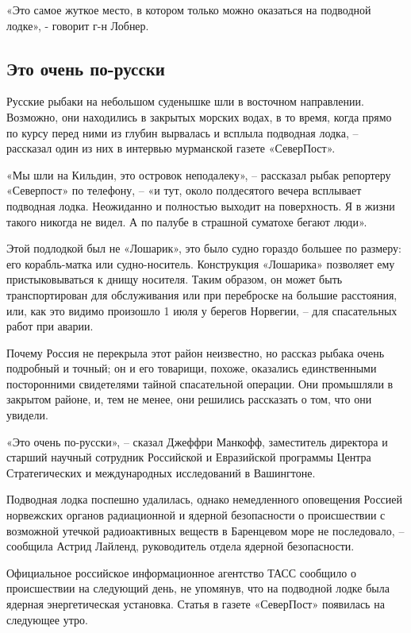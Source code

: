 «Это самое жуткое место, в котором только можно оказаться на подводной
лодке», - говорит г-н Лобнер.

\hypertarget{ux44dux442ux43e-ux43eux447ux435ux43dux44c-ux43fux43e-ux440ux443ux441ux441ux43aux438}{%
\subsection{Это очень
по-русски}\label{ux44dux442ux43e-ux43eux447ux435ux43dux44c-ux43fux43e-ux440ux443ux441ux441ux43aux438}}

Русские рыбаки на небольшом суденышке шли в восточном направлении.
Возможно, они находились в закрытых морских водах, в то время, когда
прямо по курсу перед ними из глубин вырвалась и всплыла подводная лодка,
-- рассказал один из них в интервью мурманской газете «СеверПост».

«Мы шли на Кильдин, это островок неподалеку», -- рассказал рыбак
репортеру «Северпост» по телефону, -- «и тут, около полдесятого вечера
всплывает подводная лодка. Неожиданно и полностью выходит на
поверхность. Я в жизни такого никогда не видел. А по палубе в страшной
суматохе бегают люди».

Этой подлодкой был не «Лошарик», это было судно гораздо большее по
размеру: его корабль-матка или судно-носитель. Конструкция «Лошарика»
позволяет ему пристыковываться к днищу носителя. Таким образом, он может
быть транспортирован для обслуживания или при переброске на большие
расстояния, или, как это видимо произошло 1 июля у берегов Норвегии, --
для спасательных работ при аварии.

Почему Россия не перекрыла этот район неизвестно, но рассказ рыбака
очень подробный и точный; он и его товарищи, похоже, оказались
единственными посторонними свидетелями тайной спасательной операции. Они
промышляли в закрытом районе, и, тем не менее, они решились рассказать о
том, что они увидели.

«Это очень по-русски», -- сказал Джеффри Манкофф, заместитель директора
и старший научный сотрудник Российской и Евразийской программы Центра
Стратегических и международных исследований в Вашингтоне.

Подводная лодка поспешно удалилась, однако немедленного оповещения
Россией норвежских органов радиационной и ядерной безопасности о
происшествии с возможной утечкой радиоактивных веществ в Баренцевом море
не последовало, -- сообщила Астрид Лайленд, руководитель отдела ядерной
безопасности.

Официальное российское информационное агентство ТАСС сообщило о
происшествии на следующий день, не упомянув, что на подводной лодке была
ядерная энергетическая установка. Статья в газете «СеверПост» появилась
на следующее утро.

